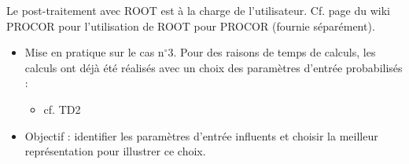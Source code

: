 \begin{frame}[fragile]
Le post-traitement avec ROOT est à la charge de l'utilisateur. Cf. page du wiki PROCOR pour l'utilisation de ROOT pour PROCOR (fournie séparément).


\begin{itemize}
    \item Mise en pratique sur le cas n$^{\circ}$3. Pour des raisons de temps de calculs, les calculs ont déjà été réalisés avec un choix des paramètres d'entrée probabilisés : 
    
    \begin{itemize}
        \item cf. TD2
    \end{itemize}

    \item Objectif : identifier les paramètres d'entrée influents et choisir la meilleur représentation pour illustrer ce choix.
\end{itemize}

\end{frame}
